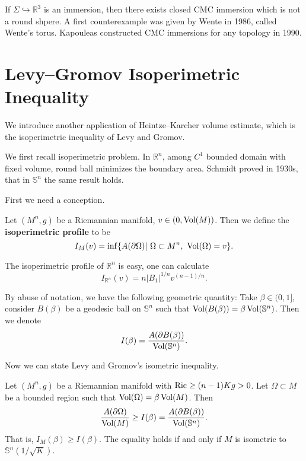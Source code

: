 \begin{rem}
    If $\Sigma\hookrightarrow\mathbb{R}^3$ is an immersion, then there exists closed CMC immersion which is not a round shpere.
    A first counterexample was given by Wente in 1986, called Wente's torus.
    Kapouleas constructed CMC immersions for any topology in 1990.
\end{rem}

\section{Levy--Gromov Isoperimetric Inequality}

We introduce another application of Heintze--Karcher volume estimate, which is the isoperimetric inequality of Levy and Gromov.

We first recall isoperimetric problem.
In $\mathbb{R}^n$, among $C^1$ bounded domain with fixed volume, round ball minimizes the boundary area.
Schmidt proved in 1930s, that in $\mathbb{S}^n$ the same result holds.

First we need a conception.
\begin{defn}
    Let $(M^n,g)$ be a Riemannian manifold, $v\in(0,\operatorname{Vol}(M))$.
    Then we define the \textbf{isoperimetric profile} to be
    \[I_M(v)=\inf\{A(\partial\Omega)|\ \Omega\subset M^n,\ \operatorname{Vol}(\Omega)=v\}.\]
\end{defn}
\begin{eg}
    The isoperimetric profile of $\mathbb{R}^n$ is easy, one can calculate
    \[I_{\mathbb{R}^n}(v)=n|B_1|^{1/n}v^{(n-1)/n}.\]
\end{eg}

By abuse of notation, we have the following geometric quantity:
Take $\beta\in(0,1]$, consider $B(\beta)$ be a geodesic ball on $\mathbb{S}^n$ such that $\operatorname{Vol}(B(\beta))=\beta\operatorname{Vol}(\mathbb{S}^n)$.
Then we denote
\[I(\beta)=\frac{A(\partial B(\beta))}{\operatorname{Vol}(\mathbb{S}^n)}.\]

Now we can state Levy and Gromov's isometric inequality.
\begin{thm}\label{Levy Gromov}
    Let $(M^n,g)$ be a Riemannian manifold with $\operatorname{Ric}\geq(n-1)Kg>0$.
    Let $\Omega\subset M$ be a bounded region such that $\operatorname{Vol}(\Omega)=\beta\operatorname{Vol}(M)$.
    Then
    \[\frac{A(\partial\Omega)}{\operatorname{Vol}(M)}\geq I(\beta)=\frac{A(\partial B(\beta))}{\operatorname{Vol}(\mathbb{S}^n)}.\]
    That is, $I_M(\beta)\geq I(\beta)$.
    The equality holds if and only if $M$ is isometric to $\mathbb{S}^n(1/\sqrt{K})$.
\end{thm}

